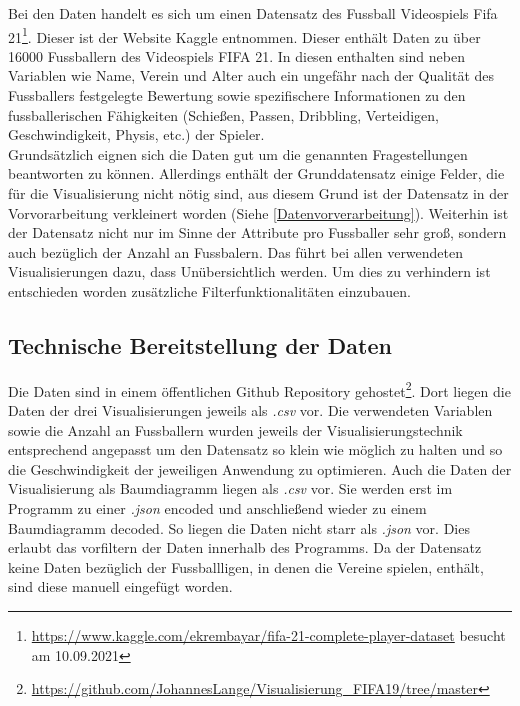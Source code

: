 \documentclass[usegeometry=true]{scrartcl}
\begin{document}
Bei den Daten handelt es sich um einen Datensatz des Fussball Videospiels Fifa 21\footnote{\url{https://www.kaggle.com/ekrembayar/fifa-21-complete-player-dataset} besucht am 10.09.2021}. Dieser ist der Website Kaggle entnommen. Dieser enthält Daten zu über 16000 Fussballern des Videospiels FIFA 21. In diesen enthalten sind neben Variablen wie Name, Verein und Alter auch ein ungefähr nach der Qualität des Fussballers festgelegte Bewertung sowie spezifischere Informationen zu den fussballerischen Fähigkeiten (Schießen, Passen, Dribbling, Verteidigen, Geschwindigkeit, Physis, etc.) der Spieler.\\
Grundsätzlich eignen sich die Daten gut um die genannten Fragestellungen beantworten zu können. Allerdings enthält der Grunddatensatz einige Felder, die für die Visualisierung nicht nötig sind, aus diesem Grund ist der Datensatz in der Vorvorarbeitung verkleinert worden (Siehe \ref{Datenvorverarbeitung}). Weiterhin ist der Datensatz nicht nur im Sinne der Attribute pro Fussballer sehr groß, sondern auch bezüglich der Anzahl an Fussbalern. Das führt bei allen verwendeten Visualisierungen dazu, dass Unübersichtlich werden. Um dies zu verhindern ist entschieden worden zusätzliche Filterfunktionalitäten einzubauen. %

\subsection{Technische Bereitstellung der Daten}
Die Daten sind in einem öffentlichen Github Repository gehostet\footnote{\url{https://github.com/JohannesLange/Visualisierung_FIFA19/tree/master}}. Dort liegen die Daten der drei Visualisierungen jeweils als \textit{.csv} vor. Die verwendeten Variablen sowie die Anzahl an Fussballern wurden jeweils der Visualisierungstechnik entsprechend angepasst um den Datensatz so klein wie möglich zu halten und so die Geschwindigkeit der jeweiligen Anwendung zu optimieren.
Auch die Daten der Visualisierung als Baumdiagramm liegen als \textit{.csv} vor. Sie werden erst im Programm zu einer \textit{.json} encoded und anschließend wieder zu einem Baumdiagramm decoded. So liegen die Daten nicht starr als \textit{.json} vor. Dies erlaubt das vorfiltern der Daten innerhalb des Programms. Da der Datensatz keine Daten bezüglich der Fussballligen, in denen die Vereine spielen, enthält, sind diese manuell eingefügt worden.
\end{document}
